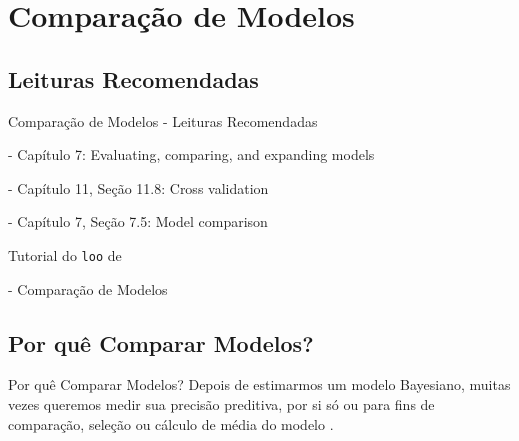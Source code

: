 \section{Comparação de Modelos}

\subsection{Leituras Recomendadas}
\begin{frame}{Comparação de Modelos - Leituras Recomendadas}
    \begin{vfilleditems}
        \item \textcite{gelman2013bayesian} - Capítulo 7: Evaluating, comparing, and expanding models
        \item \textcite{gelman2020regression} - Capítulo 11, Seção 11.8: Cross validation
        \item \textcite{mcelreath2020statistical} - Capítulo 7, Seção 7.5: Model comparison
        \item \textcite{vehtariPracticalBayesianModel2015}
        \item Tutorial do \texttt{loo} de \textcite{loo}
        \item \textcite{storopoli2021estatisticabayesianaR} - Comparação de Modelos
        \item \textcite{spiegelhalter2002bayesian}
        \item \textcite{van2005dic}
        \item \textcite{watanabe2010asymptotic}
        \item \textcite{gelfand1996model}
        \item \textcite{watanabe2010asymptotic}
        \item \textcite{geisser1979predictive}
    \end{vfilleditems}
\end{frame}

\subsection{Por quê Comparar Modelos?}
\begin{frame}{Por quê Comparar Modelos?}
    Depois de estimarmos um modelo Bayesiano,
    muitas vezes queremos medir sua precisão preditiva, por si só ou para
    fins de comparação, seleção ou cálculo de média do modelo \parencite{geisser1979predictive}.
\end{frame}

